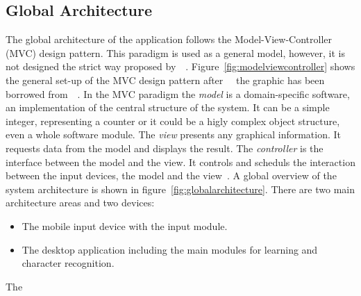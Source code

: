 \subsection{Global Architecture}
\label{sec:globalarchitecture}

The global architecture of the application follows the Model-View-Controller
(MVC) design pattern. This paradigm is used as a general model, however, 
it is not designed the strict way proposed by~~\citeyear{Krasner1988}.
Figure~\ref{fig:modelviewcontroller} shows the general set-up of the 
MVC design pattern after~~\citeyear{Krasner1988} the graphic has been borrowed 
from~~\citeyear{Schatten2010}.
In the MVC paradigm the \emph{model} is a domain-specific software, 
an implementation of the central structure of the system. It can be a simple
integer, representing a counter or it could be a higly complex object structure, 
even a whole software module. The \emph{view} presents any graphical information. 
It requests data from the model and displays the result. The \emph{controller} 
is the interface between the model and the view. It controls and scheduls the 
interaction between the input devices, the model and the 
view~.
A global overview of the system architecture is shown in 
figure~\ref{fig:globalarchitecture}.
There are two main architecture areas and two devices:
\begin{itemize}
\item The mobile input device with the input module.
\item The desktop application including the main modules for learning
      and character recognition.
\end{itemize}
The


